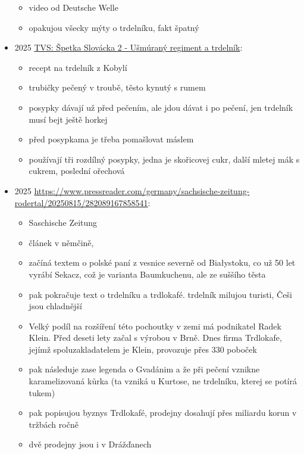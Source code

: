 \begin{itemize}
  \begin{itemize}
  \tightlist
  \item
    video od Deutsche Welle
  \item
    opakujou všecky mýty o trdelníku, fakt špatný
  \end{itemize}
\item
  2025 \href{https://www.youtube.com/watch?v=cw2WAJ3Pyvs}{TVS: Špetka
  Slovácka 2 - Ušmúraný regiment a trdelník}:

  \begin{itemize}
  \tightlist
  \item
    recept na trdelník z Kobylí
  \item
    trubičky pečený v troubě, těsto kynutý s rumem
  \item
    posypky dávají už před pečením, ale jdou dávat i po pečení, jen
    trdelník musí bejt ještě horkej
  \item
    před posypkama je třeba pomašlovat máslem
  \item
    používají tři rozdílný posypky, jedna je skořicovej cukr, další
    mletej mák s cukrem, poslední ořechová
  \end{itemize}
\item
  2025
  \href{Ein\%20süber\%20Prügel\%20erobert\%20Europa}{\url{https://www.pressreader.com/germany/sachsische-zeitung-rodertal/20250815/282089167858541}}:

  \begin{itemize}
  \tightlist
  \item
    Saschische Zeitung
  \item
    článek v němčině,
  \item
    začíná textem o polské paní z vesnice severně od Białystoku, co už
    50 let vyrábí Sekacz, což je varianta Baumkuchenu, ale ze suššího
    těsta
  \item
    pak pokračuje text o trdelníku a trdlokafé. trdelník milujou
    turisti, Češi jsou chladnější
  \item
    Velký podíl na rozšíření této pochoutky v zemi má podnikatel Radek
    Klein. Před deseti lety začal s výrobou v Brně. Dnes firma
    Trdlokafe, jejímž spoluzakladatelem je Klein, provozuje přes 330
    poboček
  \item
    pak následuje zase legenda o Gvadánim a že při pečení vznikne
    karamelizovaná kůrka (ta vzniká u Kurtose, ne trdelníku, kterej se
    potírá tukem)
  \item
    pak popisujou byznys Trdlokafé, prodejny dosahují přes miliardu
    korun v tržbách ročně
  \item
    dvě prodejny jsou i v Drážďanech
  \end{itemize}
\end{itemize}


